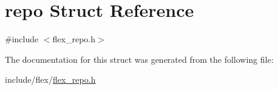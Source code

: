 \hypertarget{structrepo}{}\section{repo Struct Reference}
\label{structrepo}


{\ttfamily \#include $<$flex\+\_\+repo.\+h$>$}



The documentation for this struct was generated from the following file\+:\begin{DoxyCompactItemize}
\item 
include/flex/\hyperlink{flex__repo_8h}{flex\+\_\+repo.\+h}\end{DoxyCompactItemize}
